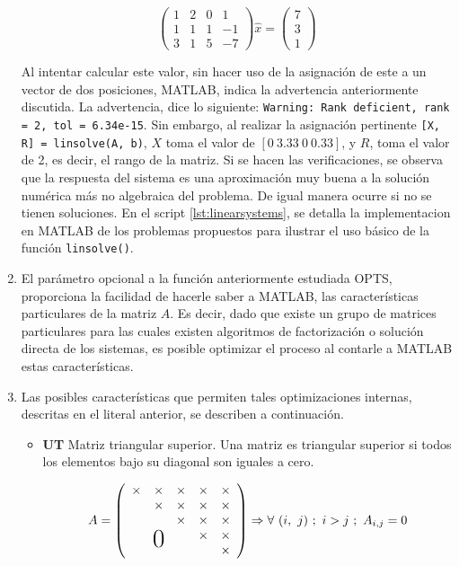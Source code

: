 \documentclass[11pt, spanish]{article}
\newcommand\x{\times}
\newcommand\bigzero{\makebox(0,0){\text{\huge0}}}
\begin{document}
\begin{enumerate}
$$\left(\begin{array}{cccc} 1 & 2 & 0 & 1\\ 1 & 1 & 1 & -1\\ 3 & 1 & 5 & -7 \end{array}\right) \hat{x} = \left(\begin{array}{c} 7\\ 3\\ 1 \end{array}\right)$$

Al intentar calcular este valor, sin hacer uso de la asignación de este a un vector de dos posiciones, \textsc{MATLAB}, indica la advertencia anteriormente discutida. La advertencia, dice lo siguiente: \texttt{Warning: Rank deficient, rank = 2, tol =  6.34e-15}. Sin embargo, al realizar la asignación pertinente \texttt{[X, R] = linsolve(A, b)}, $X$  toma el valor de $[0\ 3.33\ 0\ 0.33]$, y $R$, toma el valor de 2, es decir, el rango de la matriz. Si se hacen las verificaciones, se observa que la respuesta del sistema es una aproximación muy buena a la solución numérica más no algebraica del problema. De igual manera ocurre si no se tienen soluciones. En el script \ref{lst:linearsystems}, se detalla la implementacion en \textsc{MATLAB} de los problemas propuestos para ilustrar el uso básico de la función \texttt{linsolve()}.


\item El parámetro opcional a la función anteriormente estudiada OPTS, proporciona la facilidad de hacerle saber a \textsc{MATLAB}, las características particulares de la matriz $A$. Es decir, dado que existe un grupo de matrices particulares para las cuales existen algoritmos de factorización o solución directa de los sistemas, es posible optimizar el proceso al contarle a \textsc{MATLAB} estas características. 

\item Las posibles características que permiten tales optimizaciones internas, descritas en el literal anterior, se describen a continuación.

\begin{itemize}

\item \textbf{UT} Matriz triangular superior. Una matriz es triangular superior si todos los elementos bajo su diagonal son iguales a cero.

$$ A = 
  \left(
    \begin{array}{ccccc}
    \x    & \x       & \x    & \x    & \x \\ 
     & \x       & \x    & \x    & \x \\ 
          &   & \x    & \x    & \x \\
          & \bigzero &  & \x    & \x \\ 
          &          &       &  & \x \\ 
  \end{array}\right) \Rightarrow \forall\ (i,\ j)\ ;\  i > j\ ;\ A_{i,j} = 0
$$


\end{itemize}
\end{enumerate}
\end{document}
